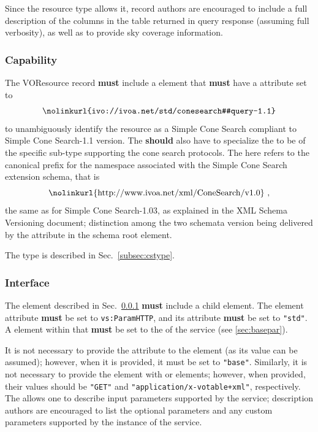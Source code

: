 \documentclass[11pt,a4paper]{ivoa}
\begin{document}
Since the  resource type allows it, record authors are encouraged to include a full description of the columns in the table returned in query response (assuming full verbosity), as well as to provide sky coverage information.

\subsubsection{Capability}
\label{subsec:capability}
The VOResource record \textbf{must} include a  element that \textbf{must} have a  attribute set to
$$\hbox{\nolinkurl{ivo://ivoa.net/std/conesearch#query-1.1}}$$
to unambiguously identify the resource as a Simple Cone Search compliant to Simple Cone Search-1.1 version. The  \textbf{should} also have  to specialize the  to be of the specific sub-type supporting the cone search protocols. The  here refers to the canonical prefix for the namespace associated with the Simple Cone Search extension schema, that is
$$\hbox{\nolinkurl{http://www.ivoa.net/xml/ConeSearch/v1.0} ,}$$
the same as for Simple Cone Search-1.03, as explained in the XML Schema
Versioning \citep{note:schemaversioning} document; distinction among the
two schemata version being delivered by the  attribute in
the schema root element.

The  type is described in Sec.~\ref{subsec:cstype}.

\subsubsection{Interface}
The  element described in Sec.~\ref{subsec:capability} \textbf{must} include a child  element.
The  element  attribute \textbf{must} be set to \texttt{vs:ParamHTTP}, and its  attribute \textbf{must} be set to \texttt{"std"}. A  element within that
 \textbf{must} be set to the  of the service (see \ref{sec:basepar}). 

It is not necessary to provide the  attribute to the
 element (as its value can be assumed); however, when
it is provided, it must be set to \texttt{"base"}. Similarly, it is not
necessary to provide the  element with
 or  elements; however, when
provided, their values should be \texttt{"GET"} and
\texttt{"application/x-votable+xml"}, respectively. The
 allows one to describe input parameters supported
by the service; description authors are encouraged to list the optional
parameters and any custom parameters supported by the instance of the
service.  
\end{document}

